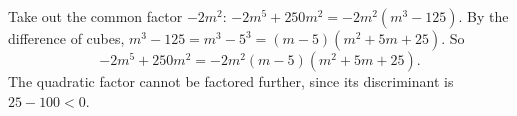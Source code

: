 Take out the common factor $-2m^2$: $-2m^5+250m^2=-2m^2\left(m^3-125\right)$. By the difference of cubes, $m^3-125=m^3-5^3=(m-5)\left(m^2+5m+25\right)$. So
\[-2m^5+250m^2=\boxed{-2m^2(m-5)\left(m^2+5m+25\right)}.\]
The quadratic factor cannot be factored further, since its discriminant is $25-100<0$.
